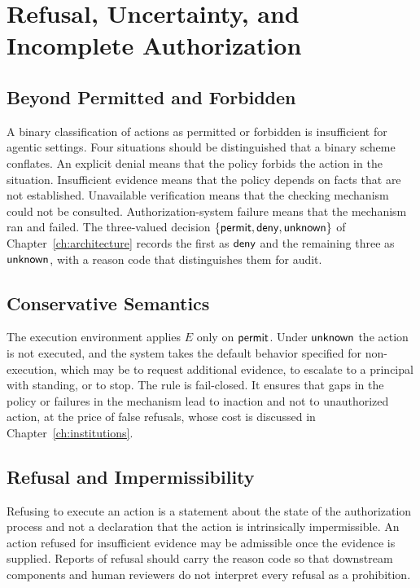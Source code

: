 \chapter{Refusal, Uncertainty, and Incomplete Authorization}
\label{ch:refusal}

\section{Beyond Permitted and Forbidden}

A binary classification of actions as permitted or forbidden is insufficient for agentic settings. Four situations should be distinguished that a binary scheme conflates. An explicit denial means that the policy forbids the action in the situation. Insufficient evidence means that the policy depends on facts that are not established. Unavailable verification means that the checking mechanism could not be consulted. Authorization-system failure means that the mechanism ran and failed. The three-valued decision $\{\mathsf{permit},\mathsf{deny},\mathsf{unknown}\}$ of Chapter~\ref{ch:architecture} records the first as $\mathsf{deny}$ and the remaining three as $\mathsf{unknown}$, with a reason code that distinguishes them for audit.

\section{Conservative Semantics}

The execution environment applies $E$ only on $\mathsf{permit}$. Under $\mathsf{unknown}$ the action is not executed, and the system takes the default behavior specified for non-execution, which may be to request additional evidence, to escalate to a principal with standing, or to stop. The rule is fail-closed. It ensures that gaps in the policy or failures in the mechanism lead to inaction and not to unauthorized action, at the price of false refusals, whose cost is discussed in Chapter~\ref{ch:institutions}.

\section{Refusal and Impermissibility}

Refusing to execute an action is a statement about the state of the authorization process and not a declaration that the action is intrinsically impermissible. An action refused for insufficient evidence may be admissible once the evidence is supplied. Reports of refusal should carry the reason code so that downstream components and human reviewers do not interpret every refusal as a prohibition.

